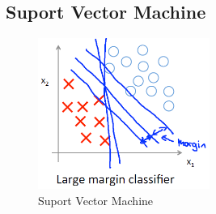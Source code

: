 \documentclass[12pt,a4paper]{article}
\begin{document}
\subsection{Suport Vector Machine}
\begin{figure}[htb]
\center
\includegraphics[width=0.5\textwidth]{suport_vector}
\caption{Suport Vector Machine}
\end{figure}
\end{document}
